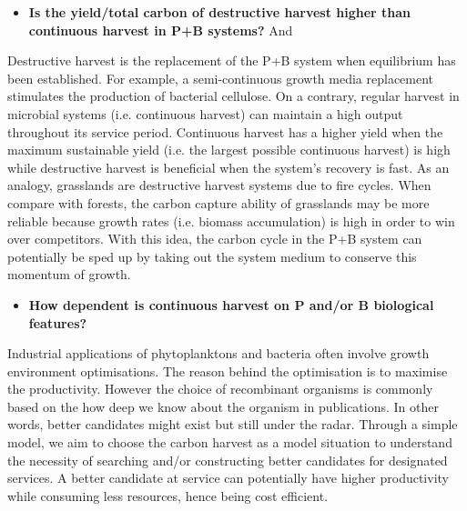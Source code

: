 \documentclass[../thesis.tex]{subfiles} %
\begin{document}
\begin{itemize}
    \item \textbf{
    Is the yield/total carbon of destructive harvest higher than continuous harvest in P+B systems?
    } And
\end{itemize}

Destructive harvest is the replacement of the P+B system when equilibrium has been established.  For example, a semi-continuous growth media replacement stimulates the production of bacterial cellulose.\autocite{aytekin2016statistical}  On a contrary, regular harvest in microbial systems (i.e. continuous harvest) can maintain a high output throughout its service period.  Continuous harvest has a higher yield when the maximum sustainable yield (i.e. the largest possible continuous harvest) is high while destructive harvest is beneficial when the system's recovery is fast.  As an analogy, grasslands are destructive harvest systems due to fire cycles.  When compare with forests, the carbon capture ability of grasslands may be more reliable\autocite{dass2018grasslands} because growth rates (i.e. biomass accumulation) is high in order to win over competitors.  With this idea, the carbon cycle in the P+B system can potentially be sped up by taking out the system medium to conserve this momentum of growth.

\begin{itemize}
    \item \textbf{
    How dependent is continuous harvest on P and/or B biological features?
    }
\end{itemize}

Industrial applications of phytoplanktons and bacteria often involve growth environment optimisations.\autocite{dash2013marine,naik2013lead,huang2012industrial,evanson_2019}  The reason behind the optimisation is to maximise the productivity.  However the choice of recombinant organisms is commonly based on the how deep we know about the organism in publications.\autocite{huang2012industrial}  In other words, better candidates might exist but still under the radar.  Through a simple model, we aim to choose the carbon harvest as a model situation to understand the necessity of searching and/or constructing better candidates for designated services.  A better candidate at service can potentially have higher productivity while consuming less resources, hence being cost efficient.
\end{document}

